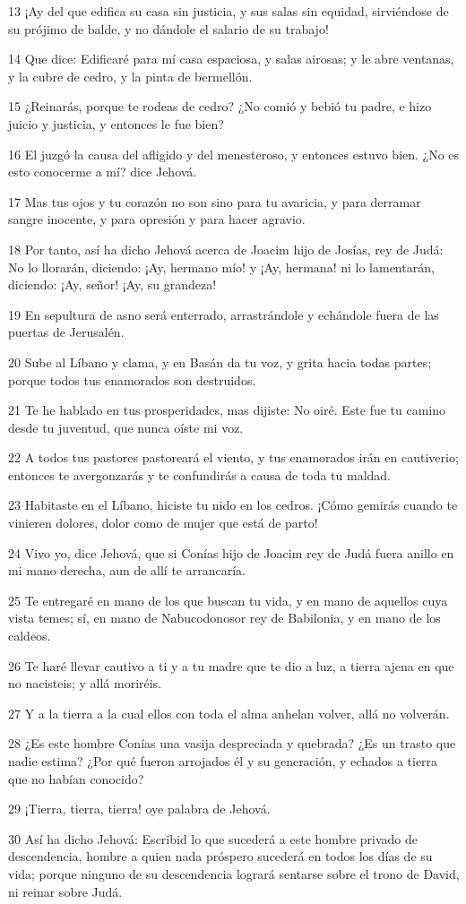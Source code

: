\par 13 ¡Ay del que edifica su casa sin justicia, y sus salas sin equidad, sirviéndose de su prójimo de balde, y no dándole el salario de su trabajo!
\par 14 Que dice: Edificaré para mí casa espaciosa, y salas airosas; y le abre ventanas, y la cubre de cedro, y la pinta de bermellón. 
\par 15 ¿Reinarás, porque te rodeas de cedro? ¿No comió y bebió tu padre, e hizo juicio y justicia, y entonces le fue bien?
\par 16 El juzgó la causa del afligido y del menesteroso, y entonces estuvo bien. ¿No es esto conocerme a mí? dice Jehová.
\par 17 Mas tus ojos y tu corazón no son sino para tu avaricia, y para derramar sangre inocente, y para opresión y para hacer agravio.
\par 18 Por tanto, así ha dicho Jehová acerca de Joacim hijo de Josías, rey de Judá: No lo llorarán, diciendo: ¡Ay, hermano mío! y ¡Ay, hermana! ni lo lamentarán, diciendo: ¡Ay, señor! ¡Ay, su grandeza!
\par 19 En sepultura de asno será enterrado, arrastrándole y echándole fuera de las puertas de Jerusalén.
\par 20 Sube al Líbano y clama, y en Basán da tu voz, y grita hacia todas partes; porque todos tus enamorados son destruidos.
\par 21 Te he hablado en tus prosperidades, mas dijiste: No oiré. Este fue tu camino desde tu juventud, que nunca oíste mi voz.
\par 22 A todos tus pastores pastoreará el viento, y tus enamorados irán en cautiverio; entonces te avergonzarás y te confundirás a causa de toda tu maldad.
\par 23 Habitaste en el Líbano, hiciste tu nido en los cedros. ¡Cómo gemirás cuando te vinieren dolores, dolor como de mujer que está de parto!
\par 24 Vivo yo, dice Jehová, que si Conías hijo de Joacim rey de Judá fuera anillo en mi mano derecha, aun de allí te arrancaría.
\par 25 Te entregaré en mano de los que buscan tu vida, y en mano de aquellos cuya vista temes; sí, en mano de Nabucodonosor rey de Babilonia, y en mano de los caldeos.
\par 26 Te haré llevar cautivo a ti y a tu madre que te dio a luz, a tierra ajena en que no nacisteis; y allá moriréis.
\par 27 Y a la tierra a la cual ellos con toda el alma anhelan volver, allá no volverán.
\par 28 ¿Es este hombre Conías una vasija despreciada y quebrada? ¿Es un trasto que nadie estima? ¿Por qué fueron arrojados él y su generación, y echados a tierra que no habían conocido?
\par 29 ¡Tierra, tierra, tierra! oye palabra de Jehová.
\par 30 Así ha dicho Jehová: Escribid lo que sucederá a este hombre privado de descendencia, hombre a quien nada próspero sucederá en todos los días de su vida; porque ninguno de su descendencia logrará sentarse sobre el trono de David, ni reinar sobre Judá.


